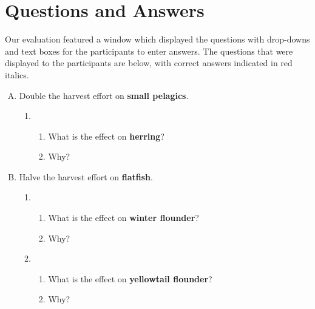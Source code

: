 \section{Questions and Answers} \label{sec:questions}

Our evaluation featured a window which displayed the questions with drop-downs and text boxes for the participants to enter answers.  The questions that were displayed to the participants are below, with correct answers indicated in red italics.

\begin{enumerate}[(A)]
\item Double the harvest effort on \textbf{small pelagics}.

\begin{enumerate}[1.]
\item 
\begin{enumerate}
\item What is the effect on \textbf{herring}? 
\item Why? 
\end{enumerate}
\end{enumerate}

\item Halve the harvest effort on \textbf{flatfish}.

\begin{enumerate}[1.] \addtocounter{enumii}{1}
\item 
\begin{enumerate}
\item What is the effect on \textbf{winter flounder}? 
\item Why? 
\end{enumerate}

\item 
\begin{enumerate}
\item What is the effect on \textbf{yellowtail flounder}? 
\item Why? 
\end{enumerate}
\end{enumerate}


\end{enumerate}

